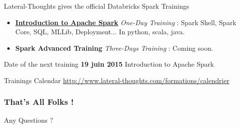 \documentclass[slidetop,9pt,utf8]{beamer}
\begin{document}
\begin{CJK}{UTF8}{gbsn}
\begin{frame}
  \begin{block}{Lateral-Thoughts gives the official Databricks Spark Trainings}
    \begin{itemize}
      \item \textbf{\href{http://www.lateral-thoughts.com/formations/formation-spark}{Introduction to Apache Spark}} \textit{One-Day Training} : \newline Spark Shell, Spark Core, SQL, MLLib, Deployment... In python, scala, java.
      \item \textbf{Spark Advanced Training} \textit{Three-Days Training} : \newline Coming soon.
    \end{itemize}
  \end{block}

  \begin{block}{Date of the next training}
    \textbf{19 juin 2015} Introduction to Apache Spark
  \end{block}

  \begin{block}{Trainings Calendar}
    \LARGE\href{http://www.lateral-thoughts.com/formations/calendrier}{http://www.lateral-thoughts.com/formations/calendrier}\normalsize
  \end{block}

\end{frame}

\begin{frame}

  \frametitle{That's All Folks !}
  
  
  \begin{center}
    \Huge Any Questions ?\normalsize
  \end{center}
\end{frame}


\end{CJK}
\end{document}
